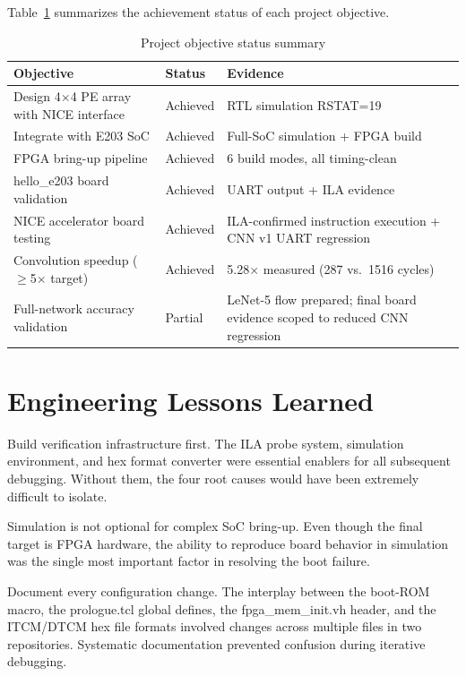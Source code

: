 Table~\ref{tab:5_1} summarizes the achievement status of each project objective.

\begin{table}[htbp]
\centering
\small
\caption{Project objective status summary}
\label{tab:5_1}
\begin{tabularx}{\textwidth}{l>{\centering\arraybackslash}p{2cm}X}
\hline
Objective & Status & Evidence \\ \hline\hline
Design 4$\times$4 PE array with NICE interface & Achieved & RTL simulation RSTAT=19 \\ \hline
Integrate with E203 SoC & Achieved & Full-SoC simulation + FPGA build \\ \hline
FPGA bring-up pipeline & Achieved & 6 build modes, all timing-clean \\ \hline
hello\_e203 board validation & Achieved & UART output + ILA evidence \\ \hline
NICE accelerator board testing & Achieved & ILA-confirmed instruction execution + CNN v1 UART regression \\ \hline
Convolution speedup ($\geq$5$\times$ target) & Achieved & 5.28$\times$ measured (287 vs.\ 1516 cycles) \\ \hline
Full-network accuracy validation & Partial & LeNet-5 flow prepared; final board evidence scoped to reduced CNN regression \\ \hline
\end{tabularx}
\end{table}

\section{Engineering Lessons Learned}\label{sec:5_4}

Build verification infrastructure first. The ILA probe system, simulation environment, and hex format converter were essential enablers for all subsequent debugging. Without them, the four root causes would have been extremely difficult to isolate.


Simulation is not optional for complex SoC bring-up. Even though the final target is FPGA hardware, the ability to reproduce board behavior in simulation was the single most important factor in resolving the boot failure.


Document every configuration change. The interplay between the boot-ROM macro, the prologue.tcl global defines, the fpga\_mem\_init.vh header, and the ITCM/DTCM hex file formats involved changes across multiple files in two repositories. Systematic documentation prevented confusion during iterative debugging.


